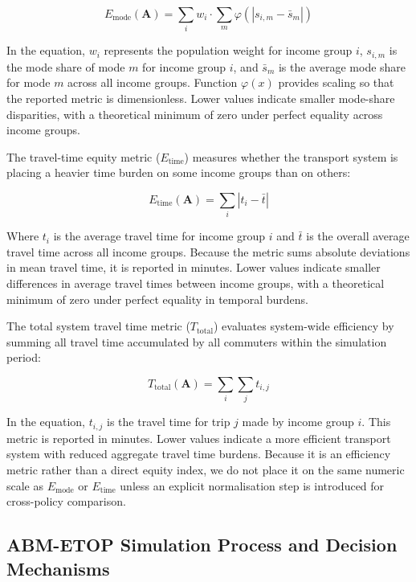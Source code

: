 \documentclass[a4paper,fleqn]{cas-sc}
\begin{document}
\begin{equation}
E_{\text{mode}}(\mathbf{A}) = \sum_{i}w_i \cdot \sum_{m}\varphi(|s_{i,m} - \bar{s}_{m}|)
\end{equation}

In the equation, $w_i$ represents the population weight for income group $i$, $s_{i,m}$ is the mode share of mode $m$ for income group $i$, and $\bar{s}_{m}$ is the average mode share for mode $m$ across all income groups. Function $\varphi(x)$ provides scaling so that the reported metric is dimensionless. Lower values indicate smaller mode-share disparities, with a theoretical minimum of zero under perfect equality across income groups.

The travel-time equity metric ($E_{\text{time}}$) measures whether the transport system is placing a heavier time burden on some income groups than on others:

\begin{equation}
E_{\text{time}}(\mathbf{A}) = \sum_{i}|t_i - \bar{t}|
\end{equation}

Where $t_i$ is the average travel time for income group $i$ and $\bar{t}$ is the overall average travel time across all income groups. Because the metric sums absolute deviations in mean travel time, it is reported in minutes. Lower values indicate smaller differences in average travel times between income groups, with a theoretical minimum of zero under perfect equality in temporal burdens.

The total system travel time metric ($T_{\text{total}}$) evaluates system-wide efficiency by summing all travel time accumulated by all commuters within the simulation period:

\begin{equation}
T_{\text{total}}(\mathbf{A}) = \sum_{i}\sum_{j}t_{i,j}
\end{equation}

In the equation, $t_{i,j}$ is the travel time for trip $j$ made by income group $i$. This metric is reported in minutes. Lower values indicate a more efficient transport system with reduced aggregate travel time burdens. Because it is an efficiency metric rather than a direct equity index, we do not place it on the same numeric scale as $E_{\text{mode}}$ or $E_{\text{time}}$ unless an explicit normalisation step is introduced for cross-policy comparison.

\subsection{ABM-ETOP Simulation Process and Decision Mechanisms}
\end{document}
